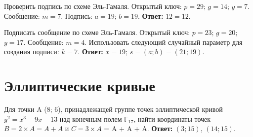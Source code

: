 \tasknumber Проверить подпись по схеме Эль-Гамаля. Открытый ключ: $p = 29$; $g = 14$; $y = 7$. Сообщение: $m = 7$. Подпись: $a = 19$;  $b = 19$.
\medbreak
\textbf{Ответ:} $12 = 12$.
\bigbreak

\tasknumber Подписать сообщение по схеме Эль-Гамаля. Открытый ключ: $p = 23$; $g = 20$; $y = 17$. Сообщение: $m = 4$. Использовать следующий случайный параметр для создания подписи: $k = 7$.
\medbreak
\textbf{Ответ:} $x = 19$; $s = (a; b) = (21; 19)$.
\bigbreak

\section{Эллиптические кривые}
\tasksection

\tasknumber Для точки A (8; 6), принадлежащей группе точек эллиптической кривой $y^2 = x^3 - 9x - 13$ над конечным полем $\mathbb{F}_{17}$, найти координаты точек $B = 2 \times A = A + A$ и $C = 3 \times A$ = A + A + A.
\medbreak
\textbf{Ответ:} $(3; 15)$, $(14; 15)$.
\bigbreak

